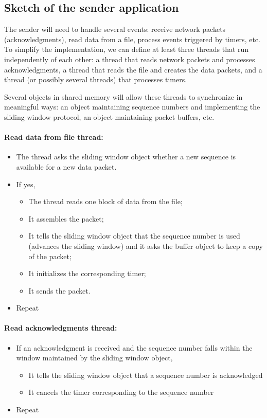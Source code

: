 \documentclass[12pt]{book}
\begin{document}
\subsection{Sketch of the sender application} 

The sender will need to handle several events: receive network packets (acknowledgments), read data from a file, process events triggered by timers, etc. To simplify the implementation, we can define at least three threads that run independently of each other: a thread that reads network packets and processes acknowledgments, a thread that reads the file and creates the data packets, and a thread (or possibly several threads) that processes timers.

Several objects in shared memory will allow these threads to synchronize in meaningful ways: an object maintaining sequence numbers and implementing the sliding window protocol, an object maintaining packet buffers, etc.

\paragraph{Read data from file thread:}

\begin{itemize}
\item The thread asks the sliding window object whether a new sequence is available for a new data packet.
\item If yes,

  \begin{itemize}
  \item  The thread reads one block of data from the file;
  \item It assembles the packet;
  \item It tells the sliding window object that the sequence number is used (advances the sliding window) and it asks the buffer object to keep a copy of the packet;
  \item It initializes the corresponding timer;
  \item It sends the packet.
  \end{itemize}
\item Repeat
\end{itemize}

\paragraph{Read acknowledgments thread:}

\begin{itemize}
\item If an acknowledgment is received and the sequence number falls within the window maintained by the sliding window object,
  \begin{itemize}
  \item It tells the sliding window object that a sequence number is acknowledged
  \item It cancels the timer corresponding to the sequence number
  \end{itemize}
\item Repeat
\end{itemize}
\end{document}
